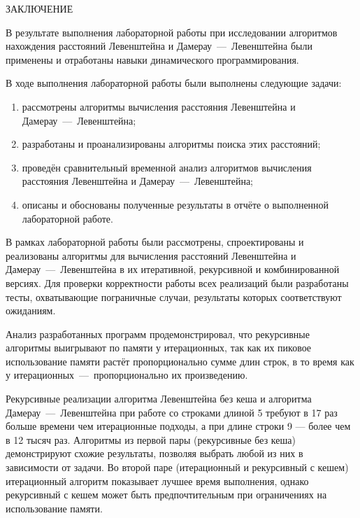 \begin{center}
    \MakeUppercase{\large Заключение}
\end{center}

\noindent
\hspace{0.75cm}
В результате выполнения лабораторной работы при исследовании алгоритмов нахождения расстояний Левенштейна и Дамерау~---~Левенштейна были применены и отработаны навыки динамического программирования.

\noindent
\hspace{0.75cm}
В ходе выполнения лабораторной работы были выполнены следующие задачи:
\renewcommand{\labelenumi}{\theenumi}
\begin{enumerate}
  \item рассмотрены алгоритмы вычисления расстояния Левенштейна и Дамерау~---~Левенштейна;
  \item разработаны и проанализированы алгоритмы поиска этих расстояний;
  \item проведён сравнительный временной анализ алгоритмов вычисления расстояния Левенштейна и Дамерау~---~Левенштейна;
  \item описаны и обоснованы полученные результаты в отчёте о выполненной лабораторной работе.
\end{enumerate}

\noindent
\hspace{0.75cm}
В рамках лабораторной работы были рассмотрены, спроектированы и реализованы алгоритмы для вычисления расстояний Левенштейна и Дамерау~---~Левенштейна в их итеративной, рекурсивной и комбинированной версиях. Для проверки корректности работы всех реализаций были разработаны тесты, охватывающие пограничные случаи, результаты которых соответствуют ожиданиям.

\noindent
\hspace{0.75cm}
Анализ разработанных программ продемонстрировал, что рекурсивные алгоритмы выигрывают по памяти у итерационных, так как их пиковое использование памяти растёт пропорционально сумме длин строк, в то время как у итерационных~---~пропорционально их произведению.

\noindent
\hspace{0.75cm}
Рекурсивные реализации алгоритма Левенштейна без кеша и алгоритма Дамерау~---~Левенштейна при работе со строками длиной 5 требуют в 17 раз больше времени чем итерационные подходы, а при длине строки 9 — более чем в 12 тысяч раз. Алгоритмы из первой пары (рекурсивные без кеша) демонстрируют схожие результаты, позволяя выбрать любой из них в зависимости от задачи. Во второй паре (итерационный и рекурсивный с кешем) итерационный алгоритм показывает лучшее время выполнения, однако рекурсивный с кешем может быть предпочтительным при ограничениях на использование памяти.
